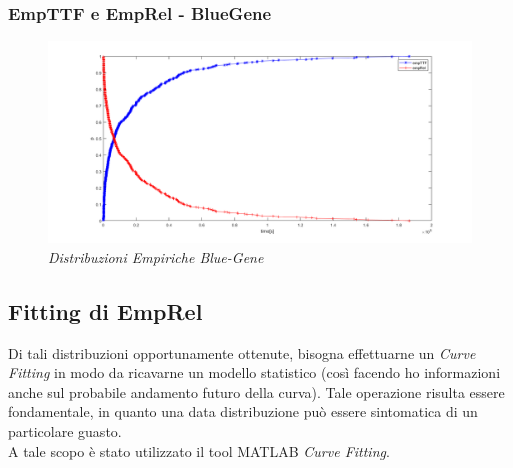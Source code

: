 \subsubsection{EmpTTF e EmpRel - BlueGene}
\begin{figure}[H]
	\centering
	\includegraphics[width=\textwidth]{img/hw6/TTF_BG.png}
	\caption{\textit{Distribuzioni Empiriche Blue-Gene}}
\end{figure}
\subsection{Fitting di EmpRel}
Di tali distribuzioni opportunamente ottenute, bisogna effettuarne un \textit{Curve Fitting} in modo da ricavarne un modello statistico (così facendo ho informazioni anche sul probabile andamento futuro della curva). Tale operazione risulta essere fondamentale, in quanto una data distribuzione può essere sintomatica di un particolare guasto.
\\A tale scopo è stato utilizzato il tool MATLAB \textit{Curve Fitting}.
